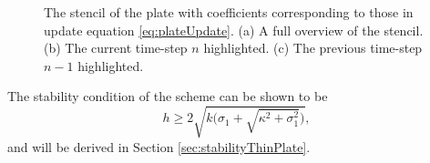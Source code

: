 \begin{figure}[t]
    \caption{The stencil of the plate with coefficients corresponding to those in update equation \eqref{eq:plateUpdate}. (a) A full overview of the stencil. (b) The current time-step $n$ highlighted. (c) The previous time-step $n-1$ highlighted. \label{fig:plateStencil}}
\end{figure}
%
The stability condition of the scheme can be shown to be
\begin{equation}\label{eq:stabilityPlate}
    h \geq 2\sqrt{k\bigg(\sigma_1 + \sqrt{\kappa^2+ \sigma_1^2}\bigg)},
\end{equation}
and will be derived in Section \ref{sec:stabilityThinPlate}.

